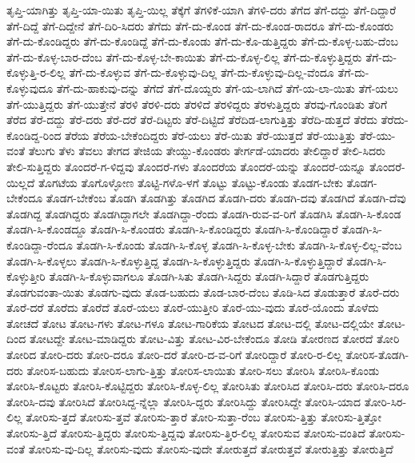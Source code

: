 {ತೃಪ್ತಿ-ಯಾಗಿತ್ತು
ತೃಪ್ತಿ-ಯಾ-ಯಿತು
ತೃಪ್ತಿ-ಯಿಲ್ಲ
ತೆಕ್ಕೆಗೆ
ತೆಗಳಿಕೆ-ಯಾಗಿ
ತೆಗಳಿ-ದರು
ತೆಗೆದ
ತೆಗೆ-ದದ್ದು
ತೆಗೆ-ದಿದ್ದಾರೆ
ತೆಗೆ-ದಿದ್ದೆ
ತೆಗೆ-ದಿದ್ದೇನೆ
ತೆಗೆ-ದಿರಿ-ಸಿದರು
ತೆಗೆದು
ತೆಗೆ-ದು-ಕೊಂಡ
ತೆಗೆ-ದು-ಕೊಂಡ-ರಾದರೂ
ತೆಗೆ-ದು-ಕೊಂಡರು
ತೆಗೆ-ದು-ಕೊಂಡಿದ್ದರು
ತೆಗೆ-ದು-ಕೊಂಡಿದ್ದೆ
ತೆಗೆ-ದು-ಕೊಂಡು
ತೆಗೆ-ದು-ಕೊ-ಡುತ್ತಿದ್ದರು
ತೆಗೆ-ದು-ಕೊಳ್ಳ-ಬಹು-ದೆಂಬ
ತೆಗೆ-ದು-ಕೊಳ್ಳ-ಬಾರ-ದೆಂಬ
ತೆಗೆ-ದು-ಕೊಳ್ಳ-ಬೇ-ಕಾಯಿತು
ತೆಗೆ-ದು-ಕೊಳ್ಳ-ಲಿಲ್ಲ
ತೆಗೆ-ದು-ಕೊಳ್ಳುತ್ತಿದ್ದರು
ತೆಗೆ-ದು-ಕೊಳ್ಳುತ್ತಿ-ರ-ಲಿಲ್ಲ
ತೆಗೆ-ದು-ಕೊಳ್ಳುವ
ತೆಗೆ-ದು-ಕೊಳ್ಳುವು-ದಿಲ್ಲ
ತೆಗೆ-ದು-ಕೊಳ್ಳುವು-ದಿಲ್ಲ-ವೆಂದೂ
ತೆಗೆ-ದು-ಕೊಳ್ಳುವುದೂ
ತೆಗೆ-ದು-ಹಾಕುವು-ದನ್ನು
ತೆಗೆದೆ
ತೆಗೆ-ದೊಯ್ದರು
ತೆಗೆ-ಯ-ಲಾಗಿದೆ
ತೆಗೆ-ಯ-ಲಾ-ಯಿತು
ತೆಗೆ-ಯಲು
ತೆಗೆ-ಯುತ್ತಿದ್ದರು
ತೆಗೆ-ಯುತ್ತೇನೆ
ತೆರಳಿ
ತೆರಳಿ-ದರು
ತೆರಳಿದೆ
ತೆರಳಿದ್ದರು
ತೆರಳುತ್ತಿದ್ದರು
ತೆರವು-ಗೊಂಡಿತು
ತೆರಿಗೆ
ತೆರೆದ
ತೆರೆ-ದದ್ದು
ತೆರೆ-ದರು
ತೆರೆ-ದರೆ
ತೆರೆ-ದಿಟ್ಟರು
ತೆರೆ-ದಿಟ್ಟಿದೆ
ತೆರೆದಿಡ-ಲಾಗುತ್ತಿತ್ತು
ತೆರೆದಿ-ಡುತ್ತದೆ
ತೆರೆದು
ತೆರೆದು-ಕೊಂಡಿದ್ದ-ರಿಂದ
ತೆರೆಯ
ತೆರೆಯ-ಬೇಕೆಂದಿದ್ದರು
ತೆರೆ-ಯಲು
ತೆರೆ-ಯಿತು
ತೆರೆ-ಯುತ್ತದೆ
ತೆರೆ-ಯುತ್ತಿತ್ತು
ತೆರೆ-ಯು-ವಂತೆ
ತೆಲುಗು
ತೆಳು
ತೆವಲು
ತೇಗದ
ತೇಜಿಯ
ತೇಯ್ದು-ಕೊಂಡರು
ತೇರ್ಗಡೆ-ಯಾದರು
ತೇಲಿದ್ದಾರೆ
ತೇಲಿ-ಸಿದರು
ತೇಲಿ-ಸುತ್ತಿದ್ದರು
ತೊಂದರೆ-ಗ-ಳಿದ್ದವು
ತೊಂದರೆ-ಗಳು
ತೊಂದರೆಯ
ತೊಂದರೆ-ಯನ್ನು
ತೊಂದರೆ-ಯನ್ನೂ
ತೊಂದರೆ-ಯಿಲ್ಲದೆ
ತೊಗಟೆಯ
ತೊಗೊಳ್ಳೋಣ
ತೊಟ್ಟಿ-ಗಳೊ-ಳಗೆ
ತೊಟ್ಟು
ತೊಟ್ಟು-ಕೊಂಡು
ತೊಡಗ-ಬೇಕು
ತೊಡಗ-ಬೇಕೆಂದೂ
ತೊಡಗ-ಬೇಕೆಂಬ
ತೊಡಗಿ
ತೊಡಗಿತ್ತು
ತೊಡಗಿದ
ತೊಡಗಿ-ದರು
ತೊಡಗಿ-ದವು
ತೊಡಗಿದೆ
ತೊಡಗಿ-ದೆವು
ತೊಡಗಿದ್ದ
ತೊಡಗಿದ್ದರು
ತೊಡಗಿದ್ದಾಗಲೇ
ತೊಡಗಿದ್ದಾ-ರೆಂದು
ತೊಡಗಿ-ರುವ-ವ-ರಿಗೆ
ತೊಡಗಿಸಿ
ತೊಡಗಿ-ಸಿ-ಕೊಂಡ
ತೊಡಗಿ-ಸಿ-ಕೊಂಡದ್ದೂ
ತೊಡಗಿ-ಸಿ-ಕೊಂಡರು
ತೊಡಗಿ-ಸಿ-ಕೊಂಡಿದ್ದರು
ತೊಡಗಿ-ಸಿ-ಕೊಂಡಿದ್ದಾರೆ
ತೊಡಗಿ-ಸಿ-ಕೊಂಡಿದ್ದಾ-ರೆಂದೂ
ತೊಡಗಿ-ಸಿ-ಕೊಂಡು
ತೊಡಗಿ-ಸಿ-ಕೊಳ್ಳ
ತೊಡಗಿ-ಸಿ-ಕೊಳ್ಳ-ಬೇಕು
ತೊಡಗಿ-ಸಿ-ಕೊಳ್ಳ-ಲಿಲ್ಲ-ವೆಂಬ
ತೊಡಗಿ-ಸಿ-ಕೊಳ್ಳಲು
ತೊಡಗಿ-ಸಿ-ಕೊಳ್ಳುತ್ತಿದ್ದ
ತೊಡಗಿ-ಸಿ-ಕೊಳ್ಳುತ್ತಿದ್ದರು
ತೊಡಗಿ-ಸಿ-ಕೊಳ್ಳುತ್ತಿದ್ದಾರೆ
ತೊಡಗಿ-ಸಿ-ಕೊಳ್ಳುತ್ತೀರಿ
ತೊಡಗಿ-ಸಿ-ಕೊಳ್ಳುವಾಗಲೂ
ತೊಡಗಿ-ಸಿತು
ತೊಡಗಿ-ಸಿದ್ದರು
ತೊಡಗಿ-ಸಿದ್ದಾರೆ
ತೊಡಗುತ್ತಿದ್ದರು
ತೊಡಗುವಂತಾ-ಯಿತು
ತೊಡಗು-ವುದು
ತೊಡ-ಬಹುದು
ತೊಡ-ಬಾರ-ದೆಂಬ
ತೊಡಿ-ಸಿದ
ತೊಡುತ್ತಾರೆ
ತೊರೆ-ದರು
ತೊರೆ-ದರೆ
ತೊರೆದು
ತೊರೆದೆ
ತೊರೆ-ಯಲು
ತೊರೆ-ಯುತ್ತೀರಿ
ತೊರೆ-ಯು-ವುದು
ತೊರೆ-ಯೊಂದು
ತೊಳೆದು
ತೋಚದೆ
ತೋಟ
ತೋಟ-ಗಳು
ತೋಟ-ಗಳೂ
ತೋಟ-ಗಾರಿಕೆಯ
ತೋಟದ
ತೋಟ-ದಲ್ಲಿ
ತೋಟ-ದಲ್ಲಿಯೇ
ತೋಟ-ದಿಂದ
ತೋಟದ್ದೇ
ತೋಟ-ಮಾಡಿದ್ದರು
ತೋಟ-ವಿತ್ತು
ತೋಟ-ವಿರ-ಬೇಕೆಂದೂ
ತೋಡಿ
ತೋರಣದ
ತೋರದೆ
ತೋರಿ
ತೋರಿದ
ತೋರಿ-ದರು
ತೋರಿ-ದರೂ
ತೋರಿ-ದರೆ
ತೋರಿ-ದ-ವ-ರಿಗೆ
ತೋರಿದ್ದಾರೆ
ತೋರಿ-ರ-ಲಿಲ್ಲ
ತೋರಿಸ-ತೊಡಗಿ-ದರು
ತೋರಿಸ-ಬಹುದು
ತೋರಿಸ-ಲಾಗು-ತ್ತಿತ್ತು
ತೋರಿಸ-ಲಾಯಿತು
ತೋರಿ-ಸಲು
ತೋರಿಸಿ
ತೋರಿಸಿ-ಕೊಂಡು
ತೋರಿಸಿ-ಕೊಟ್ಟರು
ತೋರಿಸಿ-ಕೊಟ್ಟಿದ್ದರು
ತೋರಿಸಿ-ಕೊಳ್ಳ-ಲಿಲ್ಲ
ತೋರಿಸಿತು
ತೋರಿಸಿದ
ತೋರಿಸಿ-ದರು
ತೋರಿಸಿ-ದರೂ
ತೋರಿಸಿ-ದವು
ತೋರಿಸಿದೆ
ತೋರಿಸಿದ್ದ-ನ್ನೆಲ್ಲಾ
ತೋರಿಸಿ-ದ್ದರು
ತೋರಿಸಿದ್ದು
ತೋರಿಸಿದ್ದೇ
ತೋರಿಸಿ-ಯಾದ
ತೋರಿ-ಸಿರ-ಲಿಲ್ಲ
ತೋರಿಸು-ತ್ತದೆ
ತೋರಿಸು-ತ್ತವೆ
ತೋರಿಸು-ತ್ತಾರೆ
ತೋರಿ-ಸುತ್ತಾ-ರೆಂಬ
ತೋರಿಸು-ತ್ತಿತ್ತು
ತೋರಿಸು-ತ್ತಿತ್ತೋ
ತೋರಿಸು-ತ್ತಿದೆ
ತೋರಿಸು-ತ್ತಿದ್ದರು
ತೋರಿಸು-ತ್ತಿದ್ದವು
ತೋರಿಸು-ತ್ತಿರ-ಲಿಲ್ಲ
ತೋರಿಸುವ
ತೋರಿಸು-ವಂತಿದೆ
ತೋರಿಸು-ವಂತೆ
ತೋರಿಸು-ವು-ದಿಲ್ಲ
ತೋರಿಸು-ವುದು
ತೋರಿಸು-ವುದೇ
ತೋರುತ್ತದೆ
ತೋರುತ್ತವೆ
ತೋರುತ್ತಿತ್ತು
ತೋರುತ್ತಿದೆ
}
